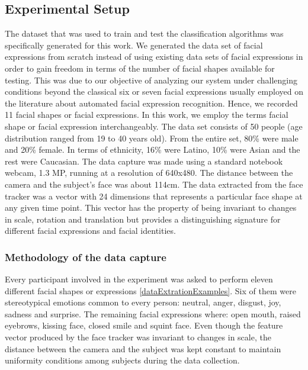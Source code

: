 \documentclass[]{article}
\begin{document}
\subsection{Experimental Setup}
The dataset that was used to train and test the classification algorithms was specifically generated for this work. We
generated the data set of facial expressions from scratch instead of using existing data sets of facial expressions in
order to gain freedom in terms of the number of facial shapes available for testing. This was due to our objective of
analyzing our system under challenging conditions beyond the classical six or seven facial expressions usually employed
on the literature about automated facial expression  recognition. Hence, we recorded 11 facial shapes or facial
expressions. In this work, we employ the terms facial shape or facial expression interchangeably. The data set consists
of 50 people (age distribution ranged from 19 to 40 years old). From the entire set, 80\% were male and 20\% female. In
terms of ethnicity, 16\% were Latino, 10\% were Asian and the rest were Caucasian. The data capture was made using a
standard notebook webcam, 1.3 MP, running at a resolution of 640x480. The distance between the camera and the subject's
face was about 114cm. The data extracted from the face tracker was a vector with 24 dimensions that represents a
particular face shape at any given time point. This vector has the property of being invariant to changes in scale,
rotation and translation but provides a distinguishing signature for different facial expressions and facial identities.


\subsubsection{Methodology of the data capture}
Every participant involved in the experiment was asked to perform eleven different facial shapes or expressions
\ref{dataExtrationExamples}. Six of them were stereotypical emotions common to every person: neutral, anger, disgust,
joy, sadness and surprise. The remaining facial expressions where: open mouth, raised eyebrows, kissing face, closed
smile and squint face. Even though the feature vector produced  by the face tracker was invariant to changes in scale,
the distance between the camera and the subject was kept constant to maintain uniformity conditions among subjects
during the data collection.
\end{document}
